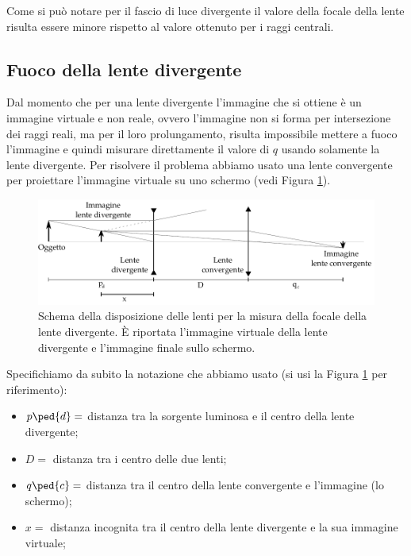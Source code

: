 

Come si può notare per il fascio di luce divergente il valore della focale della lente risulta essere minore rispetto al valore ottenuto per i raggi centrali.

\subsection{Fuoco della lente divergente}

Dal momento che per una lente divergente l'immagine che si ottiene è un immagine virtuale e non reale, ovvero l'immagine non si forma per intersezione dei raggi reali, ma per il loro prolungamento, risulta impossibile mettere a fuoco l'immagine e quindi misurare direttamente il valore di $q$ usando solamente la lente divergente.
Per risolvere il problema abbiamo usato una lente convergente per proiettare l'immagine virtuale su uno schermo (vedi Figura \ref{fig:div}).

\begin{figure}[b!]
	\includegraphics[width=16cm]{drawing2.pdf}
    \caption{Schema della disposizione delle lenti per la misura della focale della lente divergente. È riportata l'immagine
    virtuale della lente divergente e l'immagine finale sullo schermo.}
    \label{fig:div}
\end{figure}


Specifichiamo da subito la notazione che abbiamo usato (si usi la Figura \ref{fig:div} per riferimento):
\begin{itemize}
	\item{$p\ped{d} = $ distanza tra la sorgente luminosa e il centro della lente divergente;}
	\item{$D = $ distanza tra i centro delle due lenti;}
    \item{$q\ped{c} = $ distanza tra il centro della lente convergente e l'immagine (lo schermo);}
	\item{$x = $ distanza incognita tra il centro della lente divergente e la sua immagine virtuale;}
\end{itemize}

